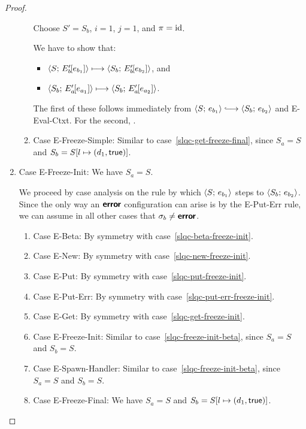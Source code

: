 \begin{proof}
\begin{enumerate}
\begin{enumerate}
      Choose $S' = S_b$, $i = 1$, $j = 1$, and $\pi = \mathrm{id}$.

      We have to show that:
      \begin{itemize}
      \item $\langle S;\, E'_b\hspace{-1mm}\left[e_{b_1}\right] \rangle \longmapsto
        \langle S_b;\, E'_b\hspace{-1mm}\left[e_{b_2}\right] \rangle$, and
      \item $\langle S_b;\, E'_a\hspace{-1mm}\left[e_{a_1}\right] \rangle \longmapsto
        \langle S_b;\, E'_a\hspace{-1mm}\left[e_{a_2}\right] \rangle$.
      \end{itemize}

      The first of these follows immediately from $\config{S}{e_{b_1}}
      \parstepsto \config{S_b}{e_{b_2}}$ and {\sc E-Eval-Ctxt}.  For
      the second, \TODO{}.

    \item \label{slqc-get-freeze-simple}Case {\sc E-Freeze-Simple}:
      Similar to case~\ref{slqc-get-freeze-final}, since $S_a = S$ and $S_b =
      S[l \mapsto (d_1, \textsf{true})]$.
    \end{enumerate}

  \item Case {\sc E-Freeze-Init}: We have $S_a = S$.

    We proceed by case analysis on the rule by which
    $\langle S;\, e_{b_1} \rangle$ steps to $\langle S_b;\, e_{b_2} \rangle$.  Since the
    only way an $\textbf{\textsf{error}}$ configuration can arise is by the {\sc
      E-Put-Err} rule, we can assume in all other cases that $\sigma_b
    \neq \textbf{\textsf{error}}$.
    \begin{enumerate}
    \item \label{slqc-freeze-init-beta}Case {\sc E-Beta}: By symmetry with case~\ref{slqc-beta-freeze-init}.
    \item \label{slqc-freeze-init-new}Case {\sc E-New}: By symmetry with case~\ref{slqc-new-freeze-init}.
    \item \label{slqc-freeze-init-put}Case {\sc E-Put}: By symmetry with case~\ref{slqc-put-freeze-init}.
    \item \label{slqc-freeze-init-put-err}Case {\sc E-Put-Err}: By symmetry with case~\ref{slqc-put-err-freeze-init}.
    \item \label{slqc-freeze-init-get}Case {\sc E-Get}: By symmetry with case~\ref{slqc-get-freeze-init}.
    \item \label{slqc-freeze-init-freeze-init}Case {\sc
      E-Freeze-Init}: Similar to case~\ref{slqc-freeze-init-beta},
      since $S_a = S$ and $S_b = S$.
    \item \label{slqc-freeze-init-spawn-handler}Case {\sc
      E-Spawn-Handler}: Similar to case~\ref{slqc-freeze-init-beta},
      since $S_a = S$ and $S_b = S$.
    \item \label{slqc-freeze-init-freeze-final}Case {\sc
      E-Freeze-Final}: We have $S_a = S$ and $S_b =
      S[l \mapsto (d_1, \textsf{true})]$.


\end{enumerate}
\end{enumerate}
\end{proof}
